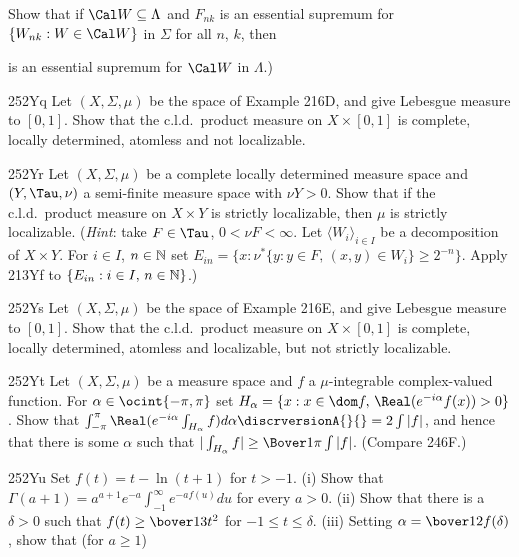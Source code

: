 {\noindent Show that if $\Cal W\subseteq\Lambda$ and $F_{nk}$ is an
essential supremum for $\{W_{nk}:W\in\Cal W\}$ in $\Sigma$ for all $n$,
$k$, then


\noindent is an essential supremum for $\Cal W$ in $\Lambda$.)

\spheader 252Yq Let $(X,\Sigma,\mu)$ be the space of Example
216D, and give Lebesgue measure to $[0,1]$.   Show that the c.l.d.\
product measure on $X\times [0,1]$ is complete, locally determined,
atomless and not localizable.

\spheader 252Yr Let $(X,\Sigma,\mu)$ be a complete locally
determined measure space and $(Y,\Tau,\nu)$ a semi-finite measure space
with $\nu Y>0$.   Show that if the c.l.d.\ product measure on
$X\times Y$ is strictly localizable, then $\mu$ is strictly localizable.
({\it Hint\/}:  take $F\in\Tau$, $0<\nu F<\infty$.   Let
$\langle W_i\rangle_{i\in I}$ be a decomposition of $X\times Y$.   For
$i\in I$, $n\in\Bbb N$
set $E_{in}=\{x:\nu^*\{y:y\in F,\,(x,y)\in W_i\}\ge 2^{-n}\}$.   Apply
213Yf to $\{E_{in}:i\in I,\,n\in\Bbb N\}$.)

\spheader 252Ys Let $(X,\Sigma,\mu)$ be the space of Example
216E, and give Lebesgue measure to $[0,1]$.   Show that the c.l.d.\
product measure on $X\times[0,1]$ is complete, locally determined,
atomless and localizable, but not strictly localizable.

\spheader 252Yt Let $(X,\Sigma,\mu)$ be a measure space and $f$ a
$\mu$-integrable complex-valued function.   For
$\alpha\in\ocint{-\pi,\pi}$
set $H_{\alpha}=\{x:x\in\dom f,\,\Real(e^{-i\alpha}f(x))>0\}$.   Show
that $\int_{-\pi}^{\pi}\Real(e^{-i\alpha}\int_{H_{\alpha}}f)d\alpha
\discrversionA{\break}{}=2\int|f|$, and hence that there is some
$\alpha$ such that
$|\int_{H_{\alpha}}f|\ge\Bover1{\pi}\int|f|$.   (Compare 246F.)

\spheader 252Yu Set $f(t)=t-\ln(t+1)$ for $t>-1$.   (i) Show that
$\Gamma(a+1)=a^{a+1}e^{-a}\int_{-1}^{\infty}e^{-af(u)}du$ for every
$a>0$.   \Hint{substitute $u=\bover{t}{a}-1$ in 225Xh(iii).}   (ii) Show
that there is a $\delta>0$ such that $f(t)\ge\bover13t^2$ for
$-1\le t\le\delta$.   (iii)
Setting $\alpha=\bover12f(\delta)$, show that (for $a\ge 1$)


}
